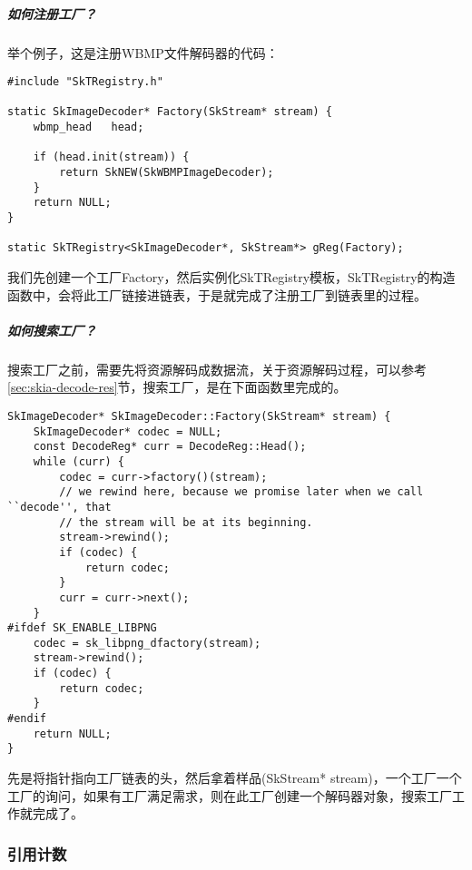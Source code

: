 \subparagraph{如何注册工厂？}

举个例子，这是注册WBMP文件解码器的代码：
\begin{lstlisting}[language={[ANSI]C},label=skia-reg-decoder,caption=注册解码器范例]
#include "SkTRegistry.h"

static SkImageDecoder* Factory(SkStream* stream) {
    wbmp_head   head;

    if (head.init(stream)) {
        return SkNEW(SkWBMPImageDecoder);
    }
    return NULL;
}

static SkTRegistry<SkImageDecoder*, SkStream*> gReg(Factory);
\end{lstlisting}

我们先创建一个工厂Factory，然后实例化SkTRegistry模板，SkTRegistry的构造函数中，会将此工厂链接进链表，于是就完成了注册工厂到链表里的过程。

\subparagraph{如何搜索工厂？}

搜索工厂之前，需要先将资源解码成数据流，关于资源解码过程，可以参考\ref{sec:skia-decode-res}节，搜索工厂，是在下面函数里完成的。

\begin{lstlisting}[language={[ANSI]C},label=skia-search-factory,caption=搜索工厂]
SkImageDecoder* SkImageDecoder::Factory(SkStream* stream) {
    SkImageDecoder* codec = NULL;
    const DecodeReg* curr = DecodeReg::Head();
    while (curr) {
        codec = curr->factory()(stream);
        // we rewind here, because we promise later when we call ``decode'', that
        // the stream will be at its beginning.
        stream->rewind();
        if (codec) {
            return codec;
        }
        curr = curr->next();
    }
#ifdef SK_ENABLE_LIBPNG
    codec = sk_libpng_dfactory(stream);
    stream->rewind();
    if (codec) {
        return codec;
    }
#endif
    return NULL;
}
\end{lstlisting}

先是将指针指向工厂链表的头，然后拿着样品(SkStream* stream)，一个工厂一个工厂的询问，如果有工厂满足需求，则在此工厂创建一个解码器对象，搜索工厂工作就完成了。

\subsubsection{引用计数}
\label{sec:skia-ref-count}



